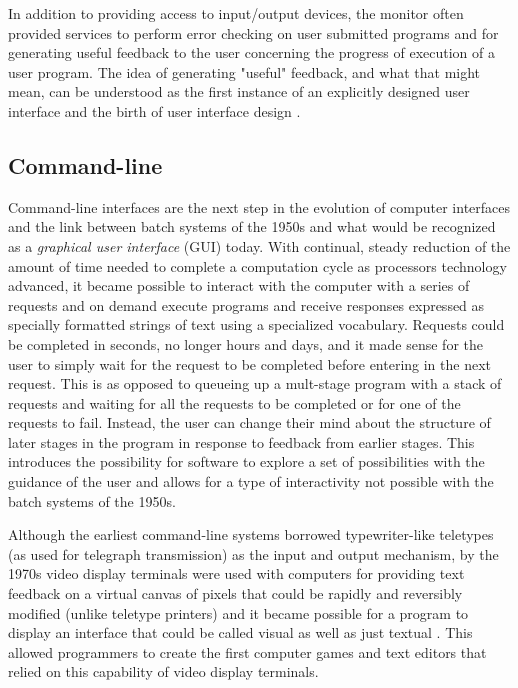 In addition to providing access to input/output devices, the monitor often provided services to perform error checking on user submitted programs and for generating useful feedback to the user concerning the progress of execution of a user program. The idea of generating "useful" feedback, and what that might mean, can be understood as the first instance of an explicitly designed user interface and the birth of user interface design \cite{unix2008}.

\subsection{Command-line}

Command-line interfaces are the next step in the evolution of computer interfaces and the link between batch systems of the 1950s and what would be recognized as a \emph{graphical user interface} (GUI) today. With continual, steady reduction of the amount of time needed to complete a computation cycle as processors technology advanced, it became possible to interact with the computer with a series of requests and on demand execute programs and receive responses expressed as specially formatted strings of text using a specialized vocabulary. Requests could be completed in seconds, no longer hours and days, and it made sense for the user to simply wait for the request to be completed before entering in the next request. This is as opposed to queueing up a mult-stage program with a stack of requests and waiting for all the requests to be completed or for one of the requests to fail. Instead, the user can change their mind about the structure of later stages in the program in response to feedback from earlier stages. This introduces the possibility for software to explore a set of possibilities with the guidance of the user and allows for a type of interactivity not possible with the batch systems of the 1950s. 

Although the earliest command-line systems borrowed typewriter-like teletypes (as used for telegraph transmission) as the input and output mechanism, by the 1970s video display terminals were used with computers for providing text feedback on a virtual canvas of pixels that could be rapidly and reversibly modified (unlike teletype printers) and it became possible for a program to display an interface that could be called visual as well as just textual \cite{unix2008}. This allowed programmers to create the first computer games and text editors that relied on this capability of video display terminals.

